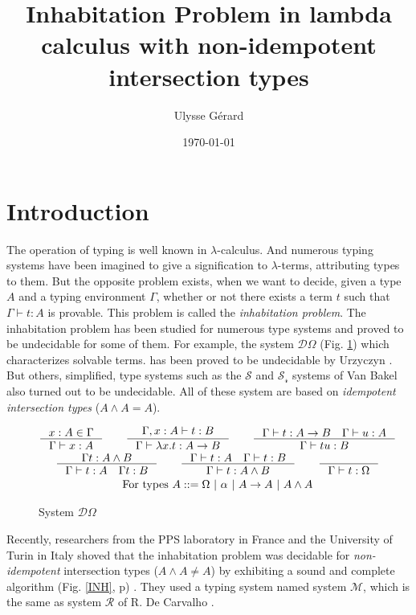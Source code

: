 \documentclass{article}
\title{\textbf{Inhabitation Problem in lambda calculus with non-idempotent intersection types}}
\author{Ulysse Gérard}
\date\today
\def\lcalc{$\lambda$-calculus}
\def\lterms{$\lambda$-terms}
\begin{document}
\maketitle

\section{Introduction}
The operation of typing is well known in \lcalc. And numerous typing systems have been imagined to give a signification to \lterms, attributing types to them. But the opposite problem exists, when we want to decide, given a type $A$ and a typing environment $\Gamma$, whether or not there exists a term $t$ such that $\Gamma \vdash t : A$ is provable. This problem is called the \emph{inhabitation problem}.
The inhabitation problem has been studied for numerous type systems and proved to be undecidable for some of them. For example, the system $\mathcal{D}\Omega$ (Fig. \ref{SDO}) \cite{Kriv} which characterizes solvable terms. %
has been proved to be undecidable by Urzyczyn \cite{Urz}. But others, simplified, type systems such as the  $\mathcal{S}$ and $\mathcal{S_r}$ systems of Van Bakel \cite{VBak} also turned out to be undecidable. All of these system are based on \emph{idempotent intersection types} ($A\wedge A = A$).

\begin{figure}
    \begin{mdframed}
        \begin{gather*}
        \inference[]{x : A \in \Gamma}{\Gamma \vdash x : A}
        \qquad
        \inference[]{\Gamma, x : A \vdash t : B}{\Gamma \vdash \lambda x.t : A \rightarrow B}
        \qquad
        \inference[]{\Gamma \vdash t : A \rightarrow B \quad \Gamma \vdash u : A}{\Gamma \vdash tu : B}
        \\
        \inference[]{\Gamma t : A \wedge B}{\Gamma \vdash t : A \quad \Gamma t : B}
        \qquad
        \inference[]{\Gamma \vdash t : A \quad \Gamma \vdash t : B}{\Gamma \vdash t : A \wedge B}
        \qquad
        \inference[]{}{\Gamma \vdash t : \Omega}
        \\ \text{For types } A ::= \Omega \ | \ \alpha \ | \ A \rightarrow A \ | \ A \wedge A
        \end{gather*}
    \end{mdframed}
    \caption{System $\mathcal{D}\Omega$}
    \label{SDO}
\end{figure}

Recently, researchers from the PPS laboratory in France and the University of Turin in Italy shoved that the inhabitation problem was decidable for \emph{non-idempotent} intersection types ($A\wedge A\neq A$) by exhibiting a sound and complete algorithm (Fig. \ref{INH}, p\pageref{INH}) \cite{Kes}. They used a typing system named system $\mathcal{M}$, which is the same as system $\mathcal{R}$ of R. De Carvalho \cite{DeCarvalho}.
\end{document}
